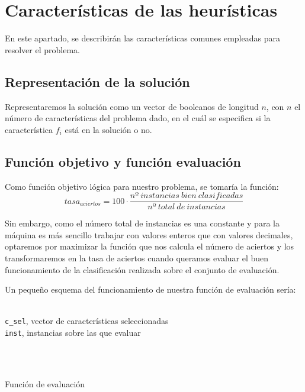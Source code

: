 \section{Características de las heurísticas}
	En este apartado, se describirán las características comunes empleadas para resolver
	el problema.
	
	\subsection{Representación de la solución}
		Representaremos la solución como un vector de booleanos de longitud $n$, con $n$
		el número de características del problema dado, en el cuál se especifica si la
		característica $f_i$ está en la solución o no.
	
	\subsection{Función objetivo y función evaluación}
		Como función objetivo lógica para nuestro problema, se tomaría la función:
		$$tasa_{aciertos} = 100 \cdot \frac{nº\ instancias\ bien\ clasificadas}{nº\ total\ de\ instancias}$$
		
		Sin embargo, como el número total de instancias es una constante y para la máquina
		es más sencillo trabajar con valores enteros que con valores decimales, optaremos
		por maximizar la función que nos calcula el número de aciertos y los transformaremos
		en la tasa de aciertos cuando queramos evaluar el buen funcionamiento de la
		clasificación realizada sobre el conjunto de evaluación.
		
		Un pequeño esquema del funcionamiento de nuestra función de evaluación sería:

		\begin{algorithm}[H]
			\begin{algorithmic}[1]

				\REQUIRE \ \\
		        	\texttt{c\_sel}, vector de características seleccionadas\\
		        	\texttt{inst}, instancias sobre las que evaluar\\ \

		     	\\
					\ELSE
					\ENDIF
			  		
					\ENDIF
				\ENDFOR
	  
			\end{algorithmic}
   \caption{Función de evaluación}
   \label{Evaluate}
		\end{algorithm}
		
